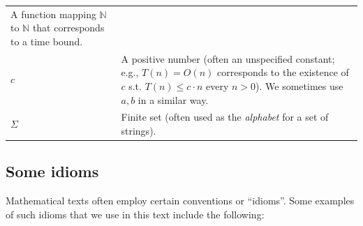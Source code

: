 \begin{longtable}[]{@{}ll@{}}
\begin{minipage}[t]{0.83\columnwidth}
A function mapping \(\mathbb{N}\) to \(\mathbb{N}\) that corresponds to
a time bound.\strut
\end{minipage}\tabularnewline
\begin{minipage}[t]{0.11\columnwidth}\raggedright
\(c\)\strut
\end{minipage} & \begin{minipage}[t]{0.83\columnwidth}\raggedright
A positive number (often an unspecified constant; e.g., \(T(n)=O(n)\)
corresponds to the existence of \(c\) s.t. \(T(n) \leq c \cdot n\) every
\(n>0\)). We sometimes use \(a,b\) in a similar way.\strut
\end{minipage}\tabularnewline
\begin{minipage}[t]{0.11\columnwidth}\raggedright
\(\Sigma\)\strut
\end{minipage} & \begin{minipage}[t]{0.83\columnwidth}\raggedright
Finite set (often used as the \emph{alphabet} for a set of
strings).\strut
\end{minipage}\tabularnewline
\bottomrule
\end{longtable}

\label{notationtable}

\subsection{Some idioms}\label{Some-idioms}

Mathematical texts often employ certain conventions or ``idioms''. Some
examples of such idioms that we use in this text include the following:

